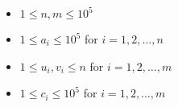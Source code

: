 \begin{itemize}
\tightlist
\item $1 \leq n,m \leq 10^5$
\item $1 \leq a_i \leq 10^5$ for $i=1,2,\ldots,n$
\item $1 \leq u_i,v_i \leq n$ for $i = 1,2,\ldots,m$
\item $1 \leq c_i \leq 10^5$ for $i = 1,2,\ldots,m$
\end{itemize}
